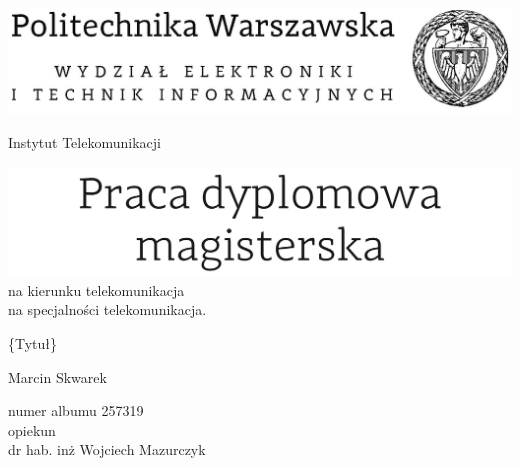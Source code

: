 
\begin{titlepage}
\begin{center}
	\includegraphics[scale=0.33]{image/weiti}
	\setmainfont[Ligatures=TeX]{Helvetica}
	\vspace{0.7cm}
	\begingroup
	\fontsize{12pt}{12pt}\selectfont
		\begin{center}  
			Instytut Telekomunikacji
		\end{center}  
	\endgroup
	\vspace{0.7cm}
	\includegraphics[scale=0.8]{image/tytul}\\
	\vspace{0.3cm}
	na kierunku telekomunikacja\\
	na specjalności telekomunikacja.\\
	\vspace{1.2cm}
	\begingroup
	\fontsize{14pt}{12pt}\selectfont
	\begin{center} 
	 	\{Tytuł\}\\
	\end{center}
	\endgroup
	\vspace{2.3cm}

	
	\begingroup
	\fontsize{21pt}{12pt}\selectfont
	\begin{center}		
		Marcin Skwarek
	\end{center}  
	\endgroup
	
		\begingroup
	\fontsize{12pt}{12pt}\selectfont
	\begin{center}		
		numer albumu 257319\\
		\vspace{0.9cm}
		opiekun\\
		dr hab. inż Wojciech Mazurczyk
	\end{center}  
	\endgroup
\end{center}
\end{titlepage}

\afterpage{\null\newpage}

